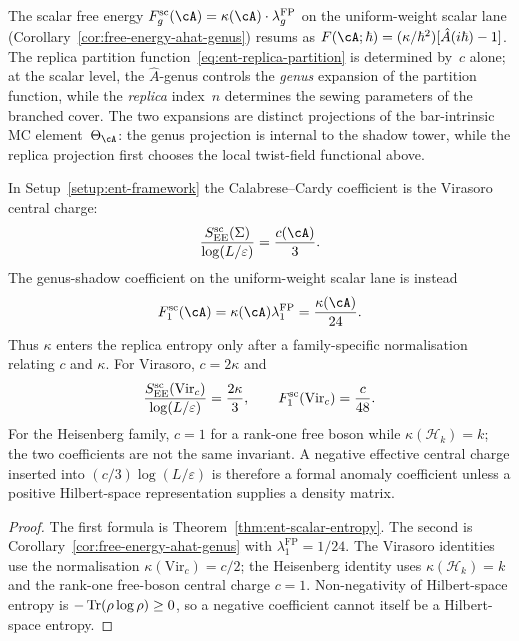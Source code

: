 \begin{remark}
\label{rem:ent-ahat-connection}
The scalar free energy
$F_g^{\mathrm{sc}}(\cA) = \kappa(\cA) \cdot \lambda_g^{\mathrm{FP}}$
on the uniform-weight scalar lane
(Corollary~\ref{cor:free-energy-ahat-genus})
resums as $F(\cA;\hbar) = (\kappa/\hbar^2)[\hat{A}(i\hbar)-1]$.
The replica partition function~\eqref{eq:ent-replica-partition}
is determined by~$c$ alone; at the scalar level, the
$\hat{A}$-genus controls the \emph{genus} expansion of the
partition function, while the \emph{replica} index~$n$
determines the sewing parameters of the branched cover.
The two expansions are distinct projections of the bar-intrinsic
MC element~$\Theta_\cA$: the genus projection is internal to the
shadow tower, while the replica projection first chooses the local
twist-field functional above.
\end{remark}

\begin{lemma}
\label{lem:ent-replica-genus-anomaly-separation}
In Setup~\textup{\ref{setup:ent-framework}} the Calabrese--Cardy
coefficient is the Virasoro central charge:
\[
 \frac{S_{\EE}^{\mathrm{sc}}(\Sigma)}
 {\log(L/\varepsilon)}
 =\frac{c(\cA)}{3}.
\]
The genus-shadow coefficient on the uniform-weight scalar lane is instead
\[
 F_1^{\mathrm{sc}}(\cA)
 =\kappa(\cA)\lambda_1^{\mathrm{FP}}
 =\frac{\kappa(\cA)}{24}.
\]
Thus $\kappa$ enters the replica entropy only after a family-specific
normalisation relating $c$ and $\kappa$.  For Virasoro,
$c=2\kappa$ and
\[
 \frac{S_{\mathrm{EE}}^{\mathrm{sc}}(\mathrm{Vir}_c)}
 {\log(L/\varepsilon)}
 =\frac{2\kappa}{3},
 \qquad
 F_1^{\mathrm{sc}}(\mathrm{Vir}_c)=\frac{c}{48}.
\]
For the Heisenberg family, $c=1$ for a rank-one free boson while
$\kappa(\mathcal H_k)=k$; the two coefficients are not the same
invariant.  A negative effective central charge inserted into
$(c/3)\log(L/\varepsilon)$ is therefore a formal anomaly coefficient
unless a positive Hilbert-space representation supplies a density
matrix.
\end{lemma}

\begin{proof}
The first formula is Theorem~\ref{thm:ent-scalar-entropy}.  The
second is Corollary~\ref{cor:free-energy-ahat-genus} with
$\lambda_1^{\mathrm{FP}}=1/24$.  The Virasoro identities use the
normalisation $\kappa(\mathrm{Vir}_c)=c/2$; the Heisenberg identity
uses $\kappa(\mathcal H_k)=k$ and the rank-one free-boson central
charge $c=1$.  Non-negativity of Hilbert-space entropy is
$-\operatorname{Tr}(\rho\log\rho)\ge0$, so a negative coefficient cannot itself be
a Hilbert-space entropy.
\end{proof}

